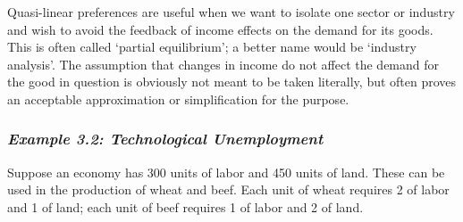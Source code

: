 Quasi-linear preferences are useful when we want to isolate one sector or industry and wish to avoid the feedback of income effects on the demand for its goods. This is often called `partial equilibrium'; a better name would be `industry analysis'. The assumption that changes in income do not affect the demand for the good in question is obviously not meant to be taken literally, but often proves an acceptable approximation or simplification for the purpose.

\subsubsection*{\textit{Example 3.2: Technological Unemployment}}

Suppose an economy has 300 units of labor and 450 units of land. These can be used in the production of wheat and beef. Each unit of wheat requires 2 of labor and 1 of land; each unit of beef requires 1 of labor and 2 of land.

